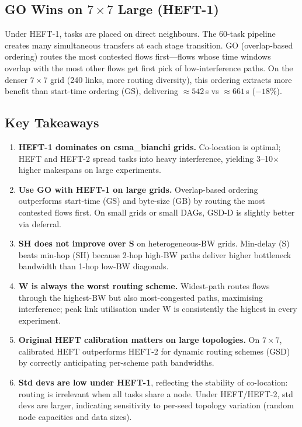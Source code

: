 \documentclass[11pt]{article}
\begin{document}
\subsection{GO Wins on $7\times7$ Large (HEFT-1)}

Under HEFT-1, tasks are placed on direct neighbours.  The 60-task pipeline
creates many simultaneous transfers at each stage transition.  GO (overlap-based
ordering) routes the most contested flows first---flows whose time windows
overlap with the most other flows get first pick of low-interference paths.  On
the denser $7\times7$ grid (240 links, more routing diversity), this ordering
extracts more benefit than start-time ordering (GS), delivering $\approx542$\,s
vs $\approx661$\,s ($-18\%$).

\subsection{Key Takeaways}

\begin{enumerate}
  \item \textbf{HEFT-1 dominates on csma\_bianchi grids.}  Co-location is
        optimal; HEFT and HEFT-2 spread tasks into heavy interference, yielding
        3--10$\times$ higher makespans on large experiments.
  \item \textbf{Use GO with HEFT-1 on large grids.}  Overlap-based ordering
        outperforms start-time (GS) and byte-size (GB) by routing the most
        contested flows first.  On small grids or small DAGs, GSD-D is slightly
        better via deferral.
  \item \textbf{SH does not improve over S} on heterogeneous-BW grids.
        Min-delay (S) beats min-hop (SH) because 2-hop high-BW paths deliver
        higher bottleneck bandwidth than 1-hop low-BW diagonals.
  \item \textbf{W is always the worst routing scheme.}  Widest-path routes
        flows through the highest-BW but also most-congested paths, maximising
        interference; peak link utilisation under W is consistently the highest
        in every experiment.
  \item \textbf{Original HEFT calibration matters on large topologies.}
        On $7\times7$, calibrated HEFT outperforms HEFT-2 for dynamic routing
        schemes (GSD) by correctly anticipating per-scheme path bandwidths.
  \item \textbf{Std devs are low under HEFT-1}, reflecting the stability of
        co-location: routing is irrelevant when all tasks share a node.  Under
        HEFT/HEFT-2, std devs are larger, indicating sensitivity to per-seed
        topology variation (random node capacities and data sizes).
\end{enumerate}
\end{document}
